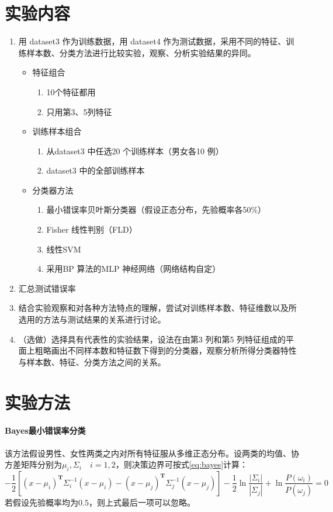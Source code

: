 \tableofcontents
\clearpage


\section{实验内容}
\begin{enumerate}
	\item 用 {\ttfamily dataset3} 作为训练数据，用 {\ttfamily dataset4} 作为测试数据，采用不同的特征、训练样本数、分类方法进行比较实验，观察、分析实验结果的异同。
	\begin{itemize}
		\item 特征组合
		\begin{enumerate}
			\item 10个特征都用
			\item 只用第3、5列特征
		\end{enumerate}
		\item 训练样本组合
		\begin{enumerate}
			\item 从dataset3 中任选20 个训练样本（男女各10 例）
			\item dataset3 中的全部训练样本
		\end{enumerate}
		\item 分类器方法
		\begin{enumerate}
			\item 最小错误率贝叶斯分类器（假设正态分布，先验概率各50\%）
			\item Fisher 线性判别（FLD）
			\item 线性SVM
			\item 采用BP 算法的MLP 神经网络（网络结构自定）
		\end{enumerate}
	\end{itemize}
	\item 汇总测试错误率
	\item 结合实验观察和对各种方法特点的理解，尝试对训练样本数、特征维数以及所选用的方法与测试结果的关系进行讨论。
	\item （选做）选择具有代表性的实验结果，设法在由第3 列和第5 列特征组成的平面上粗略画出不同样本数和特征数下得到的分类器，观察分析所得分类器特性与样本数、特征、分类方法之间的关系。
\end{enumerate}

\section{实验方法}
\paragraph{Bayes最小错误率分类}
该方法假设男性、女性两类之内对所有特征服从多维正态分布。设两类的均值、协方差矩阵分别为$\mu_i,\Sigma_i\quad i=1,2$，则决策边界可按式\autoref{eq:bayes}计算：
\begin{equation}
\label{eq:bayes}
-\frac12[(x-\mu_i)^\mathbf{T}\Sigma_i^{-1}(x-\mu_i)-(x-\mu_j)^\mathbf{T}\Sigma_j^{-1}(x-\mu_j)]-\frac12\ln \frac{|\Sigma_i|}{|\Sigma_j|}+\ln\frac{P(\omega_i)}{P(\omega_j)}=0
\end{equation}
若假设先验概率均为$0.5$，则上式最后一项可以忽略。

